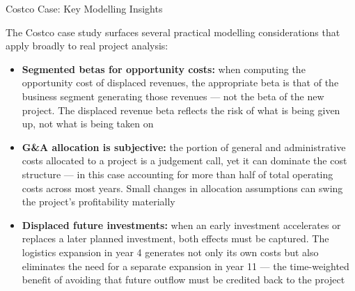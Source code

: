 \documentclass[10pt]{article}
\begin{document}
    \begin{core}{Costco Case: Key Modelling Insights}

      The Costco case study surfaces several practical modelling considerations that apply broadly to real project analysis:

      \begin{itemize}

        \item \textbf{Segmented betas for opportunity costs:} when computing the opportunity cost of displaced revenues, the appropriate beta is that of the business segment generating those revenues — not the beta of the new project. The displaced revenue beta reflects the risk of what is being given up, not what is being taken on

        \item \textbf{G\&A allocation is subjective:} the portion of general and administrative costs allocated to a project is a judgement call, yet it can dominate the cost structure — in this case accounting for more than half of total operating costs across most years. Small changes in allocation assumptions can swing the project's profitability materially

        \item \textbf{Displaced future investments:} when an early investment accelerates or replaces a later planned investment, both effects must be captured. The logistics expansion in year 4 generates not only its own costs but also eliminates the need for a separate expansion in year 11 — the time-weighted benefit of avoiding that future outflow must be credited back to the project

      \end{itemize}


    \end{core}
\end{document}
